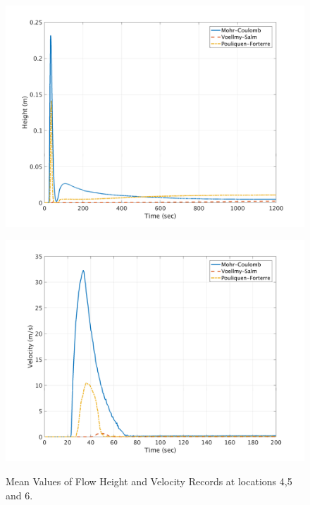 \documentclass[a4paper,10pt]{article}
\begin{document}
\begin{figure}[H]
	\begin{minipage}[b]{0.5\linewidth}
	\centering
    \includegraphics[width=1\textwidth]{HeightMeans/H6All.png}     
        \label{fig:MFHR_L6}
	\end{minipage}
	\begin{minipage}[b]{0.5\linewidth}
	\centering
    \includegraphics[width=1\textwidth]{VelocityMeans/V6All.png}
        \label{fig:MFVR_L6}
	\end{minipage}
		
	\caption{Mean Values of Flow Height and Velocity Records at locations 4,5 and 6.}\label{fig:MFHVR_L456}	
\end{figure}
\end{document}
